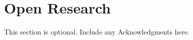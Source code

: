 \documentclass[draft]{agujournal2019}
\begin{document}

\section*{Open Research}




\acknowledgments
This section is optional. Include any Acknowledgments here.



%
%







%
%
%
%
%
\end{document}
